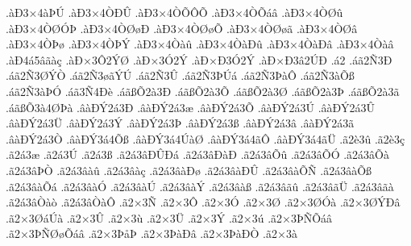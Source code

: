 {.^^e0^^d03^^d74^^e0^^de^^da
.^^e0^^d03^^d74^^d2^^d0^^db
.^^e0^^d03^^d74^^d2^^d5^^d4^^d5
.^^e0^^d03^^d74^^d2^^d5^^e1^^e2
.^^e0^^d03^^d74^^d2^^d8^^fb
.^^e0^^d03^^d74^^d2^^d8^^d3^^de
.^^e0^^d03^^d74^^d2^^d8^^f8^^d0
.^^e0^^d03^^d74^^d2^^d8^^f8^^d5
.^^e0^^d03^^d74^^d2^^d8^^f8^^e3
.^^e0^^d03^^d74^^d2^^d8^^e2
.^^e0^^d03^^d74^^d2^^de^^f8
.^^e0^^d03^^d74^^d2^^de^^dd
.^^e0^^d03^^d74^^d2^^e0^^fb
.^^e0^^d03^^d74^^d2^^e0^^d0^^fb
.^^e0^^d03^^d74^^d2^^e0^^d0^^e2
.^^e0^^d03^^d74^^d2^^e0^^e2
.^^e0^^d04^^e15^^e2^^e3^^e0^^e7
.^^e0^^d0^^d73^^d42^^dd^^d8
.^^e0^^d0^^d73^^d32^^dd
.^^e0^^d0^^d7^^d03^^d32^^dd
.^^e0^^d0^^d7^^d03^^e22^^da^^d0
.^^e12
.^^e1^^e32^^d13^^d0
.^^e1^^e32^^d13^^d8^^dd^^d2
.^^e1^^e32^^d13^^f8^^e3^^dd^^da
.^^e1^^e32^^d13^^db
.^^e1^^e32^^d13^^de^^da^^e1
.^^e1^^e32^^d13^^de^^e0^^d4
.^^e1^^e32^^d13^^e0^^d5^^df
.^^e1^^e32^^d13^^e0^^de^^d3
.^^e1^^e33^^d14^^d0^^e8
.^^e1^^e3^^df^^d52^^e03^^d0
.^^e1^^e3^^df^^d52^^e03^^d5
.^^e1^^e3^^df^^d52^^e03^^d8
.^^e1^^e3^^df^^d52^^e03^^de
.^^e1^^e3^^df^^d52^^e03^^e3
.^^e1^^e3^^df^^d53^^e04^^d8^^de^^e0
.^^e2^^e0^^d0^^dd2^^e13^^d0
.^^e2^^e0^^d0^^dd2^^e13^^e6
.^^e2^^e0^^d0^^dd2^^e13^^d5
.^^e2^^e0^^d0^^dd2^^e13^^da
.^^e2^^e0^^d0^^dd2^^e13^^db
.^^e2^^e0^^d0^^dd2^^e13^^dc
.^^e2^^e0^^d0^^dd2^^e13^^dd
.^^e2^^e0^^d0^^dd2^^e13^^de
.^^e2^^e0^^d0^^dd2^^e13^^df
.^^e2^^e0^^d0^^dd2^^e13^^e2
.^^e2^^e0^^d0^^dd2^^e13^^e3
.^^e2^^e0^^d0^^dd2^^e13^^d2
.^^e2^^e0^^d0^^dd3^^e14^^d5^^df
.^^e2^^e0^^d0^^dd3^^e14^^da^^e0^^d8
.^^e2^^e0^^d0^^dd3^^e14^^e3^^d4
.^^e2^^e0^^d0^^dd3^^e14^^e3^^dc
.^^e32^^e83^^fb
.^^e32^^e83^^e7
.^^e32^^e13^^e6
.^^e32^^e13^^da
.^^e32^^e13^^df
.^^e32^^e13^^e2^^d0^^db^^d0^^e1
.^^e32^^e13^^e2^^d0^^e0^^d0
.^^e32^^e13^^e2^^d5^^fb
.^^e32^^e13^^e2^^d5^^d3
.^^e32^^e13^^e2^^d5^^e0
.^^e32^^e13^^e2^^de^^d2
.^^e32^^e13^^e2^^e0^^fb
.^^e32^^e13^^e2^^e0^^e7
.^^e32^^e13^^e2^^e0^^d0^^f8
.^^e32^^e13^^e2^^e0^^d0^^db
.^^e32^^e13^^e2^^e0^^d5^^d1
.^^e32^^e13^^e2^^e0^^d5^^df
.^^e32^^e13^^e2^^e0^^d5^^e1
.^^e32^^e13^^e2^^e0^^d3
.^^e32^^e13^^e2^^e0^^da
.^^e32^^e13^^e2^^e0^^dd
.^^e32^^e13^^e2^^e0^^df
.^^e32^^e13^^e2^^e3^^fb
.^^e32^^e13^^e2^^e3^^dc
.^^e32^^e13^^e2^^e3^^e0
.^^e32^^e13^^e2^^d2^^e0^^f2
.^^e32^^e13^^e2^^d2^^e0^^d4
.^^e32^^d73^^d1
.^^e32^^d73^^d4
.^^e32^^d73^^d3
.^^e32^^d73^^d8
.^^e32^^d73^^d8^^d3^^e0
.^^e32^^d73^^d8^^dd^^d0^^e2
.^^e32^^d73^^d8^^e1^^da^^e0
.^^e32^^d73^^db
.^^e32^^d73^^f9
.^^e32^^d73^^dc
.^^e32^^d73^^dd
.^^e32^^d73^^fa
.^^e32^^d73^^de^^d1^^d5^^e1^^e2
.^^e32^^d73^^de^^d1^^d8^^f8^^d5^^e1^^e2
.^^e32^^d73^^de^^e5^^de
.^^e32^^d73^^de^^e0^^d0^^e2
.^^e32^^d73^^de^^e0^^d0^^d2
.^^e32^^d73^^e0
}
